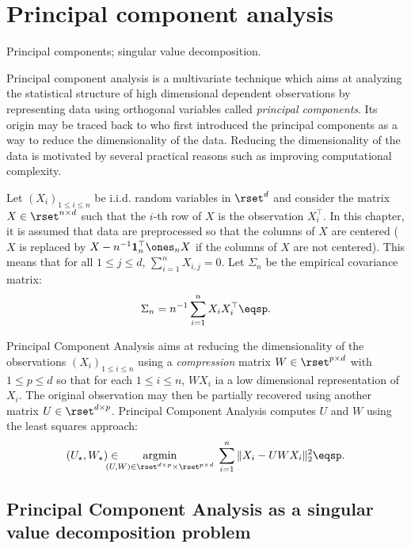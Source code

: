 \chapter{Principal component analysis}
\minitoc
\begin{kwd}
Principal components; singular value decomposition.
\end{kwd}

Principal component analysis is a multivariate technique which aims at analyzing the statistical structure of high dimensional dependent observations by representing data using orthogonal variables called {\em principal components}. Its origin may be traced back to \cite{hotelling:33} who first introduced the principal components as a way to reduce the dimensionality of the data. Reducing the dimensionality of the data is motivated by several practical reasons such as improving computational complexity.

Let $(X_i)_{1\leqslant i\leqslant n}$ be i.i.d. random variables in $\rset^d$ and consider the matrix $X\in\rset^{n\times d}$ such that the $i$-th row of $X$ is the observation $X^\top_i$. In this chapter, it is assumed that data are preprocessed so that the columns of $X$ are centered ($X$ is replaced by $X - n^{-1}\mathbf{1}^\top_n\ones_nX$ if the columns of $X$ are not centered).  This means that for all $1\leqslant j \leqslant d$, $\sum_{i=1}^{n}X_{i,j} = 0$. Let $\Sigma_n$ be the empirical covariance matrix:
$$
\Sigma_n = n^{-1}\sum_{i=1}^n X_i X^\top_i\eqsp.
$$

Principal Component Analysis  aims at reducing the dimensionality of the observations $(X_i)_{1\leqslant i \leqslant n}$ using a {\em compression} matrix $W\in \rset^{p\times d}$ with $1\leqslant p\leqslant d$ so that for each $1\leqslant i \leqslant n$, $WX_i$ ia a low dimensional representation of $X_i$. The original observation may then be partially recovered using another matrix $U\in \rset^{d\times p}$. Principal Component Analysis  computes $U$ and $W$ using the least squares approach:
\begin{align*}
(U_{\star},W_{\star}) \in \hspace{-0.5cm}\underset{(U,W)\in \rset^{d\times p}\times \rset^{p\times d}}{\mathrm{argmin}} \;\sum_{i=1}^n\|X_i - UWX_i\|_2^2\eqsp.
\end{align*}



\section{Principal Component Analysis as a singular value decomposition problem}
\label{sec:pca:svd}
